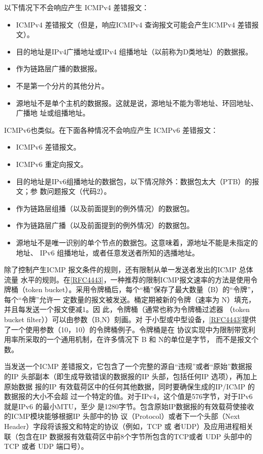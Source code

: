 以下情况下不会响应产生 ICMPv4 差错报文：
\begin{itemize}
  \item ICMPv4 差错报文（但是，响应ICMPv4 查询报文可能会产生ICMPv4 差错报文）。
  \item 目的地址是IPv4广播地址或IPv4 组播地址（以前称为D类地址）的数据报。
  \item 作为链路层广播的数据报。
  \item 不是第一个分片的其他分片。
  \item 源地址不是单个主机的数据报。这就是说，源地址不能为零地址、环回地址、广播地
    址或组播地址。
\end{itemize}

ICMPv6也类似。在下面各种情况不会响应产生 ICMPv6 差错报文：
\begin{itemize}
  \item ICMPv6 差错报文。
  \item ICMPv6 重定向报文。
  \item 目的地址是IPv6组播地址的数据包，以下情况除外：数据包太大（PTB）的报文；参
    数问题报文（代码2）。
  \item 作为链路层组播（以及前面提到的例外情况）的数据包。
  \item 作为链路层广播（以及前面提到的例外情况）的数据包。
  \item 源地址不是唯一识别的单个节点的数据包。这意味着，源地址不能是未指定的地址、
    IPv6 组播地址，或者任意发送者所知的选播地址。
\end{itemize}

除了控制产生ICMP 报文条件的规则，还有限制从单一发送者发出的ICMP 总体流量
水平的规则。在\href{https://www.rfc-editor.org/rfc/rfc4443}{[RFC4443]}，一种推荐的限制ICMP报文速率的方法是使用令牌桶（token
bucket）。采用令牌桶后，每个“桶”保存了最大数量（B）的“令牌”，每个“令牌”允许一
定数量的报文被发送。桶定期被新的令牌（速率为 N）填充，并且每发送一个报文便减1。因
此，令牌桶（通常也称为令牌桶过滤器 （token bucket filter））可以由参数（B,N）刻画。对
于小型或中型设备，\href{https://www.rfc-editor.org/rfc/rfc4443}{[RFC4443]}提供了一个使用参数（10，10）的令牌桶例子。令牌桶是在
协议实现中为限制带宽利用率所采取的一个通用机制，在许多情况下 B 和 N的单位是字节，
而不是报文个数。

当发送一个ICMP 差错报文，它包含了一个完整的源自“违规”或者“原始”数据报
的IP 头部副本（即生成导致错误的数据报的IP 头部，包括任何IP 选项），再加上原始数据
报的IP 有效载荷区中的任何其他数据，同时要确保生成的IP/ICMP 的数据报的大小不会超
过一个特定的值。对于IPv4，这个值是576字节，对于IPv6 就是IPv6 的最小MTU，至少
是1280字节。包含原始IP数据报的有效载荷使接收的ICMP模块能够根据IP 头部中的协
议（Protocol）或者下一个头部（Next Header）字段将该报文和特定的协议（例如，TCP 或
者UDP）及应用进程相关联（包含在IP 数据报有效载荷区中前8个字节所包含的TCP或者
UDP 头部中的TCP 或者 UDP 端口号）。

